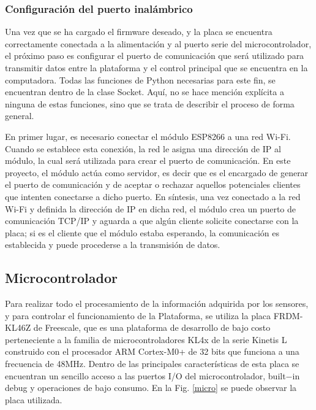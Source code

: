 \documentclass[conference,a4paper,9pt]{IEEEtran}
\begin{document}
\subsubsection{Configuración del puerto inalámbrico}

Una vez que se ha cargado el firmware deseado, y la placa se encuentra correctamente conectada a la alimentación y al puerto serie del microcontrolador, el próximo paso es configurar el puerto de comunicación que será utilizado para transmitir datos entre la plataforma y el control principal que se encuentra en la computadora. Todas las funciones de Python necesarias para este fin, se encuentran dentro de la clase Socket. Aquí, no se hace mención explícita a ninguna de estas funciones, sino que se trata de describir el proceso de forma general.

En primer lugar, es necesario conectar el módulo ESP8266 a una red Wi-Fi. Cuando se establece esta conexión, la red le asigna una dirección de IP al módulo, la cual será utilizada para crear el puerto de comunicación. En este proyecto, el módulo actúa como servidor, es decir que es el encargado de generar el puerto de comunicación y de aceptar o rechazar aquellos potenciales clientes que intenten conectarse a dicho puerto. En síntesis, una vez conectado a la red Wi-Fi y definida la dirección de IP en dicha red, el módulo crea un puerto de comunicación TCP/IP y aguarda a que algún cliente solicite conectarse con la placa; si es el cliente que el módulo estaba esperando, la comunicación es establecida y puede procederse a la transmisión de datos.

\subsection{Microcontrolador}

Para realizar todo el procesamiento de la información adquirida por los sensores, y para controlar el funcionamiento de la Plataforma, se utiliza la placa FRDM-KL46Z \cite{placa_freescale1} de Freescale, que es una plataforma de desarrollo de bajo costo perteneciente a la familia de microcontroladores KL4x de la serie Kinetis L construido con el procesador ARM Cortex-M0+ de 32 bits que funciona a una frecuencia de 48MHz. Dentro de las principales características de esta placa se encuentran un sencillo acceso a las puertos I/O del microcontrolador, built−in debug y operaciones de bajo consumo. En la Fig. \ref{micro} se puede observar la placa utilizada.
\end{document}
